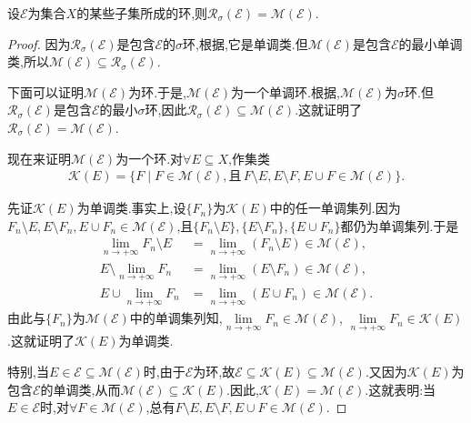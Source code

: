 \documentclass[../../main.tex]{subfiles}%
\begin{document}
\begin{theorem}\label{theorem:集合论--定理1.3.9}
设$\mathscr{E}$为集合$X$的某些子集所成的环,则$\mathscr{R}_\sigma(\mathscr{E}) = \mathscr{M}(\mathscr{E})$.
\end{theorem}
\begin{proof}
因为$\mathscr{R}_\sigma(\mathscr{E})$是包含$\mathscr{E}$的$\sigma$环,根据,它是单调类.但$\mathscr{M}(\mathscr{E})$是包含$\mathscr{E}$的最小单调类,所以$\mathscr{M}(\mathscr{E}) \subseteq \mathscr{R}_\sigma(\mathscr{E})$.

下面可以证明$\mathscr{M}(\mathscr{E})$为环.于是,$\mathscr{M}(\mathscr{E})$为一个单调环.根据,$\mathscr{M}(\mathscr{E})$为$\sigma$环.但$\mathscr{R}_\sigma(\mathscr{E})$是包含$\mathscr{E}$的最小$\sigma$环,因此$\mathscr{R}_\sigma(\mathscr{E}) \subseteq \mathscr{M}(\mathscr{E})$.这就证明了$\mathscr{R}_\sigma(\mathscr{E}) = \mathscr{M}(\mathscr{E})$.

现在来证明$\mathscr{M}(\mathscr{E})$为一个环.对$\forall E \subseteq X$,作集类
\begin{align*}
\mathscr{K}(E) = \{F \mid F \in \mathscr{M}(\mathscr{E}), \text{且} \, F \setminus E, E \setminus F, E \cup F \in \mathscr{M}(\mathscr{E})\}.
\end{align*}

先证$\mathscr{K}(E)$为单调类.事实上,设$\{F_n\}$为$\mathscr{K}(E)$中的任一单调集列.因为$F_n \setminus E, E \setminus F_n, E \cup F_n \in \mathscr{M}(\mathscr{E})$,且$\{F_n \setminus E\},\{E \setminus F_n\},\{E \cup F_n\}$都仍为单调集列.于是
\begin{align*}
\lim\limits_{n \to +\infty} F_n \setminus E &= \lim\limits_{n \to +\infty} (F_n \setminus E) \in \mathscr{M}(\mathscr{E}), \\
E \setminus \lim\limits_{n \to +\infty} F_n &= \lim\limits_{n \to +\infty} (E \setminus F_n) \in \mathscr{M}(\mathscr{E}), \\
E \cup \lim\limits_{n \to +\infty} F_n &= \lim\limits_{n \to +\infty} (E \cup F_n) \in \mathscr{M}(\mathscr{E}).
\end{align*}
由此与$\{F_n\}$为$\mathscr{M}(\mathscr{E})$中的单调集列知,$\lim\limits_{n \to +\infty} F_n \in \mathscr{M}(\mathscr{E})$, $\lim\limits_{n \to +\infty} F_n \in \mathscr{K}(E)$.这就证明了$\mathscr{K}(E)$为单调类.

特别,当$E \in \mathscr{E} \subseteq \mathscr{M}(\mathscr{E})$时,由于$\mathscr{E}$为环,故$\mathscr{E} \subseteq \mathscr{K}(E) \subseteq \mathscr{M}(\mathscr{E})$.又因为$\mathscr{K}(E)$为包含$\mathscr{E}$的单调类,从而$\mathscr{M}(\mathscr{E}) \subseteq \mathscr{K}(E)$.因此,$\mathscr{K}(E) = \mathscr{M}(\mathscr{E})$.这就表明:当$E \in \mathscr{E}$时,对$\forall F \in \mathscr{M}(\mathscr{E})$,总有$F \setminus E, E \setminus F, E \cup F \in \mathscr{M}(\mathscr{E})$.


\end{proof}
\end{document}
